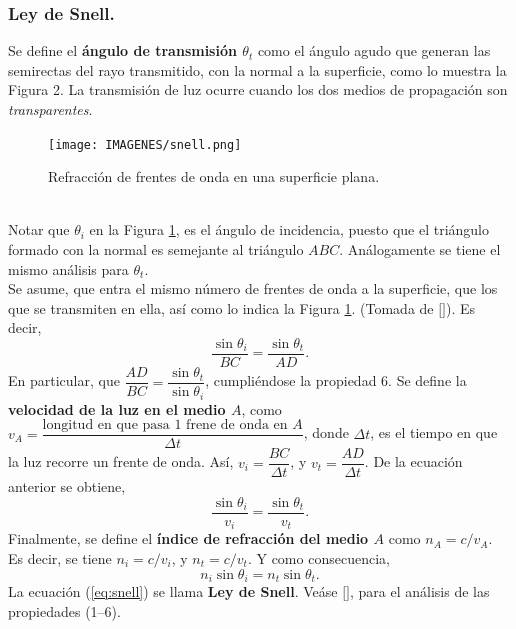 \documentclass[12pt,a4paper]{article}
\begin{document}
\subsubsection{Ley de Snell.} %
\label{subs:ley_de_snell}
Se define el \textbf{ángulo de transmisión \(\theta _t\)} como el ángulo agudo que generan las semirectas del rayo transmitido, con la normal a la superficie, como lo muestra la Figura 2. La transmisión de luz ocurre cuando los dos medios de propagación son \textit{transparentes}.
\begin{figure}[ht]
	\centering
	\texttt{[image: IMAGENES/snell.png]}
	\caption{Refracción de frentes de onda en una superficie plana.}
	\label{fig:snell}
\end{figure}\\
Notar que \(\theta _i\) en la Figura \ref{fig:snell}, es el ángulo de incidencia, puesto que el triángulo formado con la normal es semejante al triángulo \(ABC\). Análogamente se tiene el mismo análisis para \(\theta _t\). \\[2mm]
Se asume, que entra el mismo número de frentes de onda a la superficie, que los que se transmiten en ella, así como lo indica la Figura \ref{fig:snell}. (Tomada de \([\)\cite{fisica_1}\(]\)). Es decir,
\[
	\dfrac{\sin \theta _i}{BC} = \dfrac{\sin \theta _t}{AD}.
\]
En particular, que \(\dfrac{AD}{BC} = \dfrac{\sin \theta _t}{\sin \theta _i}\), cumpliéndose la propiedad 6. Se define la \textbf{velocidad de la luz en el medio \(A\)}, como \(v_A= \dfrac{\mbox{longitud en que pasa 1 frene de onda en }A}{\Delta t}\), donde \(\Delta t\), es el tiempo en que la luz recorre un frente de onda. Así, \(v_i = \dfrac{BC}{\Delta t}\), y \(v_t = \dfrac{AD}{\Delta t}\). De la ecuación anterior se obtiene,
\[
	\dfrac{\sin \theta _i}{v_i} = \dfrac{\sin \theta _t}{v_t}.
\]
Finalmente, se define el \textbf{índice de refracción del medio \(A\)} como \(n_A = c/v_A\). Es decir, se tiene \(n_i=c/v_i\), y \(n_t=c/v_t\). Y como consecuencia,
\begin{equation}
	n_i \sin \theta _i = n_t \sin \theta _t.
	\label{eq:snell}
\end{equation}
La ecuación (\ref{eq:snell}) se llama \textbf{Ley de Snell}. Veáse \([\)\cite{fisica_1}\(]\), para el análisis de las propiedades (1--6).
\end{document}
